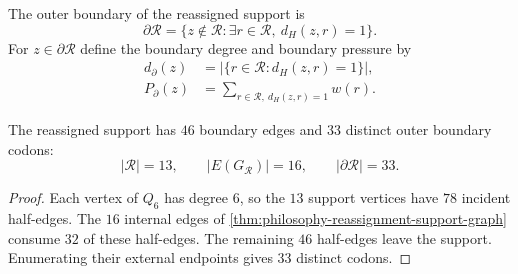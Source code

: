 \begin{definition}
\label{def:philosophy-outer-reassignment-boundary}
The outer boundary of the reassigned support is
$$
  \partial\mathcal{R}
  =
  \{z\notin\mathcal{R}:\exists r\in\mathcal{R},\ d_{H}(z,r)=1\}.
$$
For $z\in\partial\mathcal{R}$ define the boundary degree and boundary
pressure by
$$
\begin{aligned}
  d_{\partial}(z)
    &=|\{r\in\mathcal{R}:d_{H}(z,r)=1\}|,\\
  P_{\partial}(z)
    &=\sum_{r\in\mathcal{R},\ d_{H}(z,r)=1} w(r).
\end{aligned}
$$
\end{definition}

\begin{theorem}
\label{thm:philosophy-outer-boundary-size}
The reassigned support has $46$ boundary edges and $33$ distinct outer
boundary codons:
$$
  |\mathcal{R}|=13,\qquad
  |E(G_{\mathcal{R}})|=16,\qquad
  |\partial\mathcal{R}|=33.
$$
\end{theorem}
\begin{proof}
Each vertex of $Q_{6}$ has degree $6$, so the $13$ support vertices
have $78$ incident half-edges. The $16$ internal edges of
\autoref{thm:philosophy-reassignment-support-graph} consume $32$ of
these half-edges. The remaining $46$ half-edges leave the support.
Enumerating their external endpoints gives $33$ distinct codons.
\end{proof}

